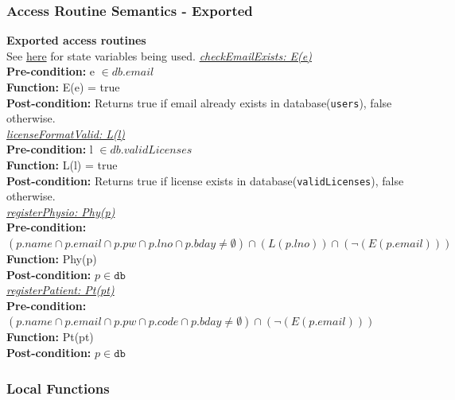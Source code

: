 \documentclass[12pt, titlepage]{article}
\begin{document}
\subsubsection{Access Routine Semantics - Exported}
\textbf{Exported access routines} \label{sec:acARS}\\
See \hyperlink{acexpprogs}{here} for state variables being used.
\newline
\textit{\underline{checkEmailExists: E(e)}}\\
\textbf{Pre-condition:}
  e $\in db.email$\\
\textbf{Function:}
  E(e) = true \\
\textbf{Post-condition:}
  Returns true if email already exists in database(\texttt{users}), false otherwise.\\
\textit{\underline{licenseFormatValid: L(l)}}\\
\textbf{Pre-condition:}
  l $\in db.validLicenses$\\
\textbf{Function:}
  L(l) = true \\
\textbf{Post-condition:}
  Returns true if license exists in database(\texttt{validLicenses}), false otherwise.\\
\textit{\underline{registerPhysio: Phy(p)}}\\
\textbf{Pre-condition:}
  $(p.name \cap p.email \cap p.pw \cap p.lno \cap p.bday \neq \emptyset)\cap (L(p.lno)) \cap (\neg (E(p.email)))$\\
\textbf{Function:}
   Phy(p)\\
\textbf{Post-condition:}
  $p \in \texttt{db}$\\
\textit{\underline{registerPatient: Pt(pt)}}\\
\textbf{Pre-condition:}
  $(p.name \cap p.email \cap p.pw \cap p.code \cap p.bday \neq \emptyset) \cap (\neg (E(p.email))) $\\
\textbf{Function:}
   Pt(pt)\\
\textbf{Post-condition:}
  $p \in \texttt{db}$\\

\subsubsection{Local Functions}
\end{document}
